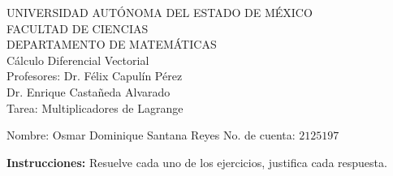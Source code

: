 \documentclass[fleqn, 12pt]{article}
\begin{document}
\begin{center}
    UNIVERSIDAD AUTÓNOMA DEL ESTADO DE MÉXICO \\
    FACULTAD DE CIENCIAS \\
    DEPARTAMENTO DE MATEMÁTICAS \\
    Cálculo Diferencial Vectorial \\
    Profesores: Dr. Félix Capulín Pérez \\
    Dr. Enrique Castañeda Alvarado \\
    Tarea: Multiplicadores de Lagrange
\end{center}

Nombre: Osmar Dominique Santana Reyes \hfill No. de cuenta: $ 2125197 $

\textbf{Instrucciones:} Resuelve cada uno de los ejercicios, justifica cada respuesta.
\end{document}
